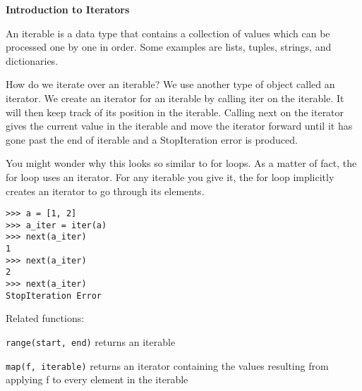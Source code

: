\textbf{Introduction to Iterators}

An iterable is a data type that contains a collection of values which can be processed one by one in order. Some examples are lists, tuples, strings, and dictionaries. 


How do we iterate over an iterable? We use another type of object called an iterator. We create an iterator for an iterable by calling iter on the iterable. It will then keep track of its position in the iterable. Calling next on the iterator gives the current value in the iterable and move the iterator forward until it has gone past the end of iterable and a StopIteration error is produced.

You might wonder why this looks so similar to for loops. As a matter of fact, the for loop uses an iterator. For any iterable you give it, the for loop implicitly creates an iterator to go through its elements.

\begin{lstlisting}
>>> a = [1, 2]
>>> a_iter = iter(a)
>>> next(a_iter)
1
>>> next(a_iter)
2
>>> next(a_iter)
StopIteration Error
\end{lstlisting}

Related functions:

\texttt{range(start, end)} returns an iterable

\texttt{map(f, iterable)} returns an iterator containing the values resulting from applying f to every element in the iterable